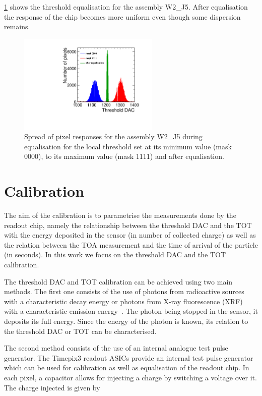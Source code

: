 \cref{fig:THLequalisation} shows the threshold equalisation for the
assembly W2\_J5. After equalisation the response of the chip becomes
more uniform even though some dispersion remains.

\begin{figure}[htbp] 
  \centering
  \includegraphics[width=0.6\textwidth]{./figures/Calibration/THLequalisation_W2_J5.pdf}
  \caption{Spread of pixel responses for the assembly W2\_J5 during
    equalisation for the local threshold set at its minimum value
    (mask 0000), to its maximum value (mask 1111) and after
    equalisation.}
  \label{fig:THLequalisation}
\end{figure}

\section{Calibration} \label{sec:calibration} The aim of the
calibration is to parametrise the measurements done by the readout
chip, namely the relationship between the threshold DAC and the TOT
with the energy deposited in the sensor (in number of collected
charge) as well as the relation between the TOA measurement and the
time of arrival of the particle (in seconds). In this work we focus on
the threshold DAC and the TOT calibration.

The threshold DAC and TOT calibration can be achieved using two main
methods. The first one consists of the use of photons from radioactive
sources with a characteristic decay energy or photons from X-ray
fluorescence (XRF) with a characteristic emission
energy~\cite{AlipourTehrani:2054922}. The photon being stopped in the
sensor, it deposits its full energy. Since the energy of the photon is
known, its relation to the threshold DAC or TOT can be characterised. 

The second method consists of the use of an internal analogue test
pulse generator. The Timepix3 readout ASICs provide an internal test
pulse generator which can be used for calibration as well as
equalisation of the readout chip. In each pixel, a capacitor allows
for injecting a charge by switching a voltage over it. The charge
injected is given by

